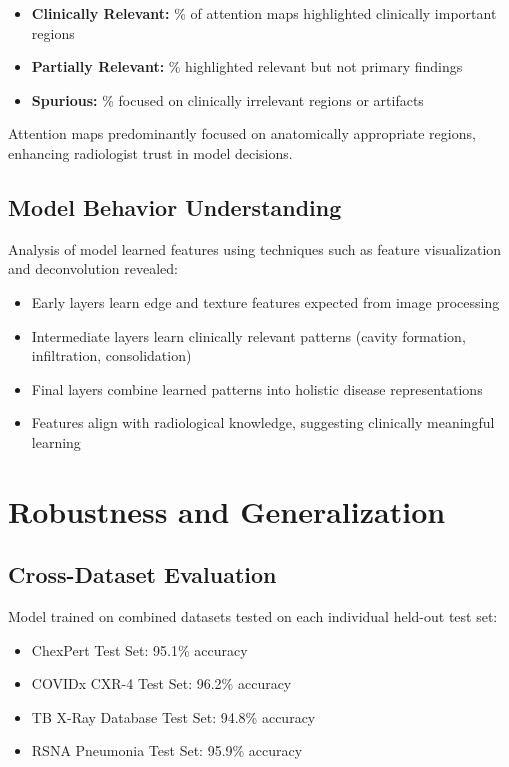 {\begin{itemize}
    \item \textbf{Clinically Relevant:} \underline{\hspace{2cm}}\% of attention maps highlighted clinically important regions
    \item \textbf{Partially Relevant:} \underline{\hspace{2cm}}\% highlighted relevant but not primary findings
    \item \textbf{Spurious:} \underline{\hspace{2cm}}\% focused on clinically irrelevant regions or artifacts
\end{itemize}

Attention maps predominantly focused on anatomically appropriate regions, enhancing radiologist trust in model decisions.

\subsection{Model Behavior Understanding}

Analysis of model learned features using techniques such as feature visualization and deconvolution revealed:

\begin{itemize}
    \item Early layers learn edge and texture features expected from image processing
    \item Intermediate layers learn clinically relevant patterns (cavity formation, infiltration, consolidation)
    \item Final layers combine learned patterns into holistic disease representations
    \item Features align with radiological knowledge, suggesting clinically meaningful learning
\end{itemize}

\section{Robustness and Generalization}

\subsection{Cross-Dataset Evaluation}

Model trained on combined datasets tested on each individual held-out test set:

\begin{itemize}
    \item ChexPert Test Set: 95.1\% accuracy
    \item COVIDx CXR-4 Test Set: 96.2\% accuracy
    \item TB X-Ray Database Test Set: 94.8\% accuracy
    \item RSNA Pneumonia Test Set: 95.9\% accuracy
\end{itemize}

}
